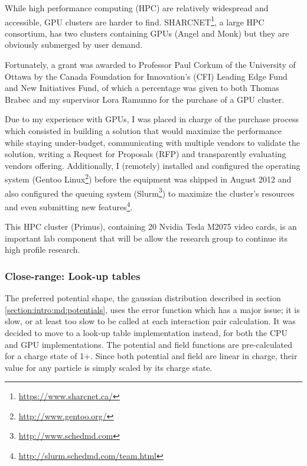 
While high performance computing (HPC) are relatively widespread and accessible,
GPU clusters are harder to find.
SHARCNET\footnote{\url{https://www.sharcnet.ca/}}, a large HPC
consortium, has two clusters containing GPUs (Angel and Monk) but they are
obviously submerged by user demand.

Fortunately, a grant was awarded to Professor Paul Corkum of the University of
Ottawa by the Canada Foundation for Innovation's (CFI) Leading Edge Fund and
New Initiatives Fund, of which a percentage was given to both Thomas Brabec
and my supervisor Lora Ramunno for the purchase of a GPU cluster.

Due to my experience with GPUs, I was placed in charge of the purchase process
which consisted in building a solution that would maximize the performance
while staying under-budget, communicating with multiple vendors to validate
the solution, writing a Request for Proposals (RFP) and transparently evaluating
vendors offering. Additionally, I (remotely) installed and configured the
operating system (Gentoo Linux\footnote{\url{http://www.gentoo.org/}}) before
the equipment was shipped in August 2012 and also configured the queuing system
(Slurm\footnote{\url{http://www.schedmd.com}}) to maximize the cluster's
resources and even submitting new
features\footnote{\url{http://slurm.schedmd.com/team.html}}.

This HPC cluster (Primus), containing 20 Nvidia Tesla M2075 video cards, is an important
lab component that will be allow the research group to continue its high profile
research.



\subsubsection{Close-range: Look-up tables}
\label{section:intro:lut}

The preferred potential shape, the gaussian distribution described in section
\ref{section:intro:md:potentials}, uses the error function which has a major
issue; it is slow, or at least too slow to be called at each interaction pair
calculation. It was decided to move to a look-up table implementation instead,
for both the CPU and GPU implementations.
The potential and field functions are pre-calculated for a charge state of 1+.
Since both potential and field are linear in charge, their value for any
particle is simply scaled by its charge state.

